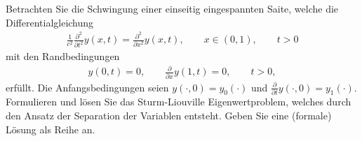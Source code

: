 \begin{exercise}
Betrachten Sie die Schwingung einer einseitig eingespannten Saite, welche die
Differentialgleichung
\begin{align*}
  \frac{1}{c^2}\frac{\partial^2}{\partial t ^2}y(x,t) = \frac{\partial^2}{\partial x^2}
  y(x,t), \qquad x \in (0,1), \qquad t > 0
\end{align*}
mit den Randbedingungen
\begin{align*}
  y(0,t) = 0, \qquad \frac{\partial}{\partial x}y(1,t) = 0, \qquad t > 0,
\end{align*}
erfüllt. Die Anfangsbedingungen seien $y(\cdot,0) = y_0(\cdot)$ und
$\frac{\partial}{\partial t}y(\cdot,0) = y_1(\cdot)$. Formulieren und lösen Sie
das Sturm-Liouville Eigenwertproblem, welches durch den Ansatz der Separation
der Variablen entsteht. Geben Sie eine (formale) Lösung als Reihe an.
\end{exercise}
